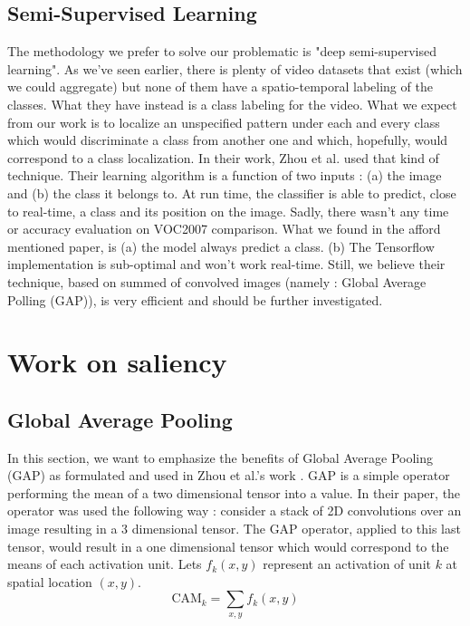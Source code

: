 		\subsection{Semi-Supervised Learning}
		\label{sub:semi_supervised_learning}
			The methodology we prefer to solve our problematic is "deep semi-supervised learning". As we've seen earlier, there is plenty of video datasets that exist (which we could aggregate) but none of them have a spatio-temporal labeling of the classes. What they have instead is a class labeling for the video. What we expect from our work is to localize an unspecified pattern under each and every class which would discriminate a class from another one and which, hopefully, would correspond to a class localization. In their work, Zhou et al. \cite{zhou2015learning} used that kind of technique. Their learning algorithm is a function of two inputs : (a) the image and (b) the class it belongs to. At run time, the classifier is able to predict, close to real-time, a class and its position on the image. Sadly, there wasn't any time or accuracy evaluation on VOC2007 comparison. 
			What we found in the afford mentioned paper, is (a) the model always predict a class. (b) The Tensorflow implementation is sub-optimal and won't work real-time. Still, we believe their technique, based on summed of convolved images (namely : Global Average Polling (GAP)), is very efficient and should be further investigated.


	
	\section{Work on saliency}
	\label{sec:work_on_saliency}

		\subsection{Global Average Pooling}
		\label{sub:global_average_pooling}
			In this section, we want to emphasize the benefits of Global Average Pooling (GAP) as formulated and used in Zhou et al.'s work \cite{zhou2015learning}. GAP is a simple operator performing the mean of a two dimensional tensor into a value. In their paper, the operator was used the following way : consider a stack of 2D convolutions over an image resulting in a 3 dimensional tensor. The GAP operator, applied to this last tensor, would result in a one dimensional tensor which would correspond to the means of each activation unit. Lets $f_k(x,y)$ represent an activation of unit $k$ at spatial location $(x,y)$.
			\begin{equation}
				\text{CAM}_k = \sum_{x,y}f_k(x,y)
			\end{equation}

